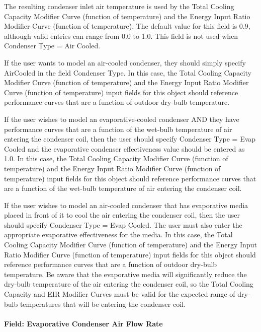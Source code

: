 The resulting condenser inlet air temperature is used by the Total Cooling Capacity Modifier Curve (function of temperature) and the Energy Input Ratio Modifier Curve (function of temperature). The default value for this field is 0.9, although valid entries can range from 0.0 to 1.0. This field is not used when Condenser Type = Air Cooled.

If the user wants to model an air-cooled condenser, they should simply specify AirCooled in the field Condenser Type. In this case, the Total Cooling Capacity Modifier Curve (function of temperature) and the Energy Input Ratio Modifier Curve (function of temperature) input fields for this object should reference performance curves that are a function of outdoor dry-bulb temperature.

If the user wishes to model an evaporative-cooled condenser AND they have performance curves that are a function of the wet-bulb temperature of air entering the condenser coil, then the user should specify Condenser Type = Evap Cooled and the evaporative condenser effectiveness value should be entered as 1.0. In this case, the Total Cooling Capacity Modifier Curve (function of temperature) and the Energy Input Ratio Modifier Curve (function of temperature) input fields for this object should reference performance curves that are a function of the wet-bulb temperature of air entering the condenser coil.

If the user wishes to model an air-cooled condenser that has evaporative media placed in front of it to cool the air entering the condenser coil, then the user should specify Condenser Type = Evap Cooled. The user must also enter the appropriate evaporative effectiveness for the media. In this case, the Total Cooling Capacity Modifier Curve (function of temperature) and the Energy Input Ratio Modifier Curve (function of temperature) input fields for this object should reference performance curves that are a function of outdoor dry-bulb temperature. Be aware that the evaporative media will significantly reduce the dry-bulb temperature of the air entering the condenser coil, so the Total Cooling Capacity and EIR Modifier Curves must be valid for the expected range of dry-bulb temperatures that will be entering the condenser coil.

\paragraph{Field: Evaporative Condenser Air Flow Rate}\label{field-evaporative-condenser-air-flow-rate}

